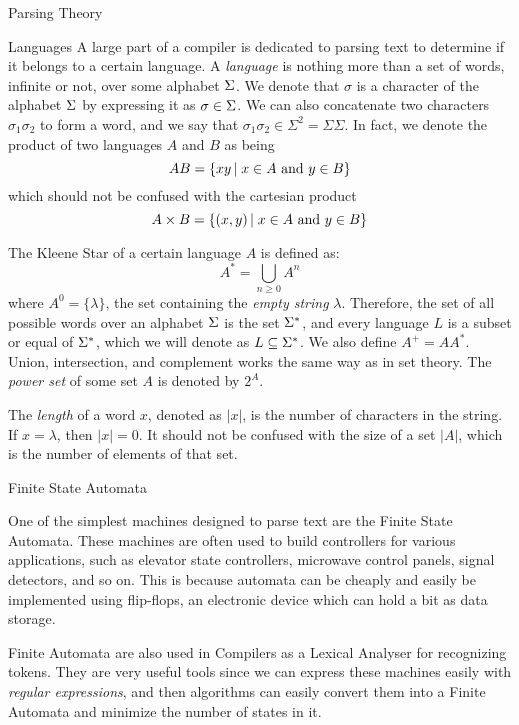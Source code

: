 \begin{section}{Parsing Theory}\label{sec:parsing}

\begin{subsection}{Languages}
A large part of a compiler is dedicated to parsing text to determine if
it belongs to a certain language. A \textit{language} is nothing more than
a set of words, infinite or not, over some alphabet $\Sigma$. We denote that
$\sigma$ is a character of the alphabet $\Sigma$ by expressing it as
$\sigma \in \Sigma$. We can also concatenate two characters $\sigma_1 \sigma_2$
to form a word, and we say that $\sigma_1 \sigma_2 \in \Sigma^2 = \Sigma\Sigma$.
In fact, we denote the product of two languages $A$ and $B$ as being
$$AB = \{xy\,|\;x \in A \text{ and } y \in B\}$$
which should not be confused with the cartesian product
$$A \times B = \{(x, y)\,|\;x \in A \text{ and } y \in B\}$$

The Kleene Star of a certain language $A$ is defined as:
$$A^* = \bigcup_{n \geq 0} A^n$$
where $A^0 = \{\lambda\}$, the set containing the \textit{empty string} $\lambda$.
Therefore, the set of all possible words over an alphabet $\Sigma$ is the set
$\Sigma^*$, and every language $L$ is a subset or equal of $\Sigma^*$, which we will
denote as $L \subseteq \Sigma^*$. We also define $A^+ = AA^*$. Union, intersection,
and complement works the same way as in set theory. The \textit{power set}
of some set $A$ is denoted by $2^A$.

The \textit{length} of a word $x$, denoted as $|x|$, is the number of characters
in the string. If $x = \lambda$, then $|x| = 0$. It should not be confused with
the size of a set $|A|$, which is the number of elements of that set.

\end{subsection}

\begin{subsection}{Finite State Automata}

One of the simplest machines designed to parse text are the
Finite State Automata. These machines are often used to build controllers for various
applications, such as elevator state controllers, microwave control panels,
signal detectors, and so on. This is because automata can be cheaply and easily
be implemented using flip-flops, an electronic device which can hold a bit as
data storage.

Finite Automata are also used in Compilers as a Lexical Analyser for
recognizing tokens.  They are very useful tools since we can express these
machines easily with \textit{regular expressions}, and then algorithms can easily
convert them into a Finite Automata and minimize the number of states in it.


\end{subsection}
\end{section}
